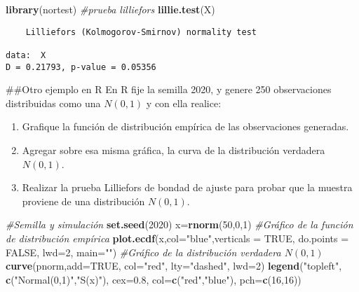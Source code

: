 \documentclass[
  a4paper,
  oneside,
  openany]{book}
\newenvironment{Shaded}{\begin{snugshade}}{\end{snugshade}}
\newcommand{\CommentTok}[1]{\textcolor[rgb]{0.56,0.35,0.01}{\textit{#1}}}
\newcommand{\DataTypeTok}[1]{\textcolor[rgb]{0.13,0.29,0.53}{#1}}
\newcommand{\DecValTok}[1]{\textcolor[rgb]{0.00,0.00,0.81}{#1}}
\newcommand{\FloatTok}[1]{\textcolor[rgb]{0.00,0.00,0.81}{#1}}
\newcommand{\KeywordTok}[1]{\textcolor[rgb]{0.13,0.29,0.53}{\textbf{#1}}}
\newcommand{\NormalTok}[1]{#1}
\newcommand{\OtherTok}[1]{\textcolor[rgb]{0.56,0.35,0.01}{#1}}
\newcommand{\StringTok}[1]{\textcolor[rgb]{0.31,0.60,0.02}{#1}}
\begin{document}
\begin{Shaded}
\begin{Highlighting}[]
\KeywordTok{library}\NormalTok{(nortest) }\CommentTok{\#prueba lilliefors}
\KeywordTok{lillie.test}\NormalTok{(X)}
\end{Highlighting}
\end{Shaded}

\begin{verbatim}
    Lilliefors (Kolmogorov-Smirnov) normality test

data:  X
D = 0.21793, p-value = 0.05356
\end{verbatim}

\#\#Otro ejemplo en R
En R fije la semilla 2020, y genere 250 observaciones distribuidas como una \(N(0, 1)\) y con ella realice:

\begin{enumerate}
\item Grafique la función de distribución empírica de las observaciones generadas.
\item Agregar sobre esa misma gráfica, la curva de la distribución verdadera $N(0,1)$. 
\item Realizar la prueba Lilliefors de bondad de ajuste para probar que la muestra proviene de una distribución $N(0,1)$.
\end{enumerate}

\begin{Shaded}
\begin{Highlighting}[]
\CommentTok{\#Semilla y simulación}
\KeywordTok{set.seed}\NormalTok{(}\DecValTok{2020}\NormalTok{)}
\NormalTok{x=}\KeywordTok{rnorm}\NormalTok{(}\DecValTok{50}\NormalTok{,}\DecValTok{0}\NormalTok{,}\DecValTok{1}\NormalTok{)}
\CommentTok{\#Gráfico de la función de distribución empírica}
\KeywordTok{plot.ecdf}\NormalTok{(x,}\DataTypeTok{col=}\StringTok{"blue"}\NormalTok{,}\DataTypeTok{verticals =} \OtherTok{TRUE}\NormalTok{, }\DataTypeTok{do.points =} \OtherTok{FALSE}\NormalTok{, }\DataTypeTok{lwd=}\DecValTok{2}\NormalTok{, }\DataTypeTok{main=}\StringTok{""}\NormalTok{)}
\CommentTok{\#Gráfico de la distribución verdadera $N(0,1)$}
\KeywordTok{curve}\NormalTok{(pnorm,}\DataTypeTok{add=}\OtherTok{TRUE}\NormalTok{, }\DataTypeTok{col=}\StringTok{"red"}\NormalTok{, }\DataTypeTok{lty=}\StringTok{"dashed"}\NormalTok{, }\DataTypeTok{lwd=}\DecValTok{2}\NormalTok{)}
\KeywordTok{legend}\NormalTok{(}\StringTok{"topleft"}\NormalTok{, }\KeywordTok{c}\NormalTok{(}\StringTok{"Normal(0,1)"}\NormalTok{,}\StringTok{"S(x)"}\NormalTok{), }\DataTypeTok{cex=}\FloatTok{0.8}\NormalTok{, }\DataTypeTok{col=}\KeywordTok{c}\NormalTok{(}\StringTok{"red"}\NormalTok{,}\StringTok{"blue"}\NormalTok{), }\DataTypeTok{pch=}\KeywordTok{c}\NormalTok{(}\DecValTok{16}\NormalTok{,}\DecValTok{16}\NormalTok{))}
\end{Highlighting}
\end{Shaded}
\end{document}
